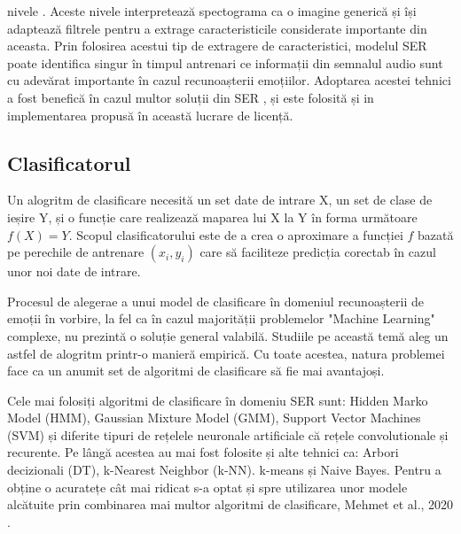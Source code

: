 \documentclass[a4paper,12pt]{book}
\begin{document}
nivele \cite{graves,tzir}. Aceste nivele interpretează spectograma ca o imagine generică și își adaptează filtrele pentru a extrage caracteristicile considerate importante din aceasta. Prin folosirea acestui tip de extragere de caracteristici, modelul SER poate identifica singur în timpul antrenari ce informații din semnalul audio sunt cu adevărat importante în cazul recunoașterii emoțiilor. Adoptarea acestei tehnici a fost benefică în cazul multor soluții din SER \cite{graves, tzir, zhang, yuan, adieu, e2e}, și este folosită și in implementarea propusă în această lucrare de licență.
					\subsection{Clasificatorul}
						Un alogritm de clasificare necesită un set date de intrare X, un set de clase de ieșire Y, și o funcție care realizează maparea lui X la Y în forma următoare \(f(X)=Y\). Scopul clasificatorului este de a crea o aproximare a funcției \(f\) bazată pe perechile de antrenare $(x_i,y_i)$ care să faciliteze predicția corectab în cazul unor noi date de intrare. \par
						
						Procesul de alegerae a unui model de clasificare în domeniul recunoașterii de emoții în vorbire, la fel ca în cazul majorității problemelor "Machine Learning" complexe, nu prezintă o soluție general valabilă. Studiile pe această temă aleg un astfel de alogritm printr-o manieră empirică. Cu toate acestea, natura problemei face ca un anumit set de algoritmi de clasificare să fie mai avantajoși.\par 
						Cele mai folosiți algoritmi de clasificare în domeniu SER sunt: Hidden Marko Model (HMM), Gaussian Mixture Model (GMM), Support Vector Machines (SVM) și diferite tipuri de rețelele neuronale artificiale că rețele convolutionale și recurente. Pe lângă acestea au mai fost folosite și alte tehnici ca: Arbori decizionali (DT), k-Nearest Neighbor (k-NN). k-means și Naive Bayes. Pentru a obține o acuratețe cât mai ridicat s-a optat și spre utilizarea unor modele alcătuite prin combinarea mai multor algoritmi de clasificare, Mehmet et al., 2020 \cite{mehmet}.
							
\end{document}
